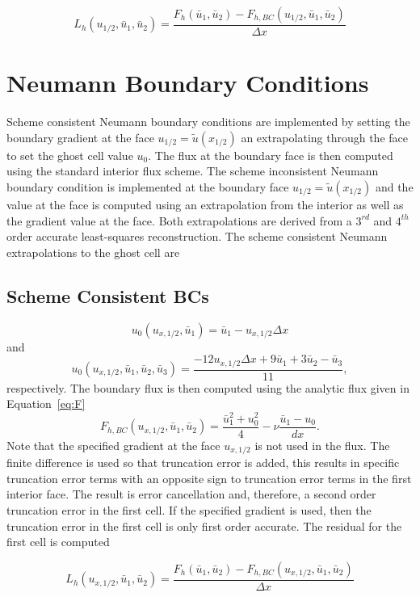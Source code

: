 \documentclass[10pt]{article}%
\begin{document}
\[
  L_h(u_{1/2},\bar u_{1},\bar u_{2}) = 
    \frac{F_h(\bar u_1, \bar u_2) - F_{h,BC}\left( u_{1/2}, \bar u_1, \bar u_2 \right)}{\Delta x}
\]






\section{Neumann Boundary Conditions}
Scheme consistent Neumann boundary conditions are implemented by setting the boundary gradient at the face $u_{1/2} = \tilde u(x_{1/2})$ an extrapolating through the face to set the ghost cell value $u_0$. The flux at the boundary face is then computed using the standard interior flux scheme. The scheme inconsistent Neumann boundary condition is implemented at the boundary face $u_{1/2} = \tilde u(x_{1/2})$ and the value at the face is computed using an extrapolation from the interior as well as the gradient value at the face. Both extrapolations are derived from a $3^{rd}$ and $4^{th}$ order accurate least-squares reconstruction. The scheme consistent Neumann extrapolations to the ghost cell are


\subsection{Scheme Consistent BCs}


\[
  u_{0}\left(u_{x,1/2}, \bar u_1 \right) = \bar u_1 - u_{x,1/2} \Delta x
\]
and
\[
  u_{0}(u_{x,1/2}, \bar u_1, \bar u_2, \bar u_3) = \frac{-12 u_{x,1/2}\Delta x + 9 \bar u_1 + 3 \bar u_2 -  \bar u_3 }{11},
\]
respectively. The boundary flux is then computed using the analytic flux given in Equation~\ref{eq:F}
\[
F_{h,BC}\left(u_{x,1/2}, \bar u_1, \bar u_2\right) 
= \frac{\bar u_1^2 + u_0^2}{4} - \nu \frac{\bar u_1 - u_0}{dx}.
\]
Note that the specified gradient at the face $u_{x,1/2}$ is not used in the flux. The finite difference is used so that truncation error is added, this results in specific truncation error terms with an opposite sign to truncation error terms in the first interior face. The result is error cancellation and, therefore, a second order truncation error in the first cell. If the specified gradient is used, then the truncation error in the first cell is only first order accurate. The residual for the first cell is computed 

\[
  L_h(u_{x,1/2},\bar u_{1},\bar u_{2}) = 
    \frac{F_h(\bar u_1, \bar u_2) - F_{h,BC}\left( u_{x,1/2}, \bar u_1, \bar u_2 \right)}{\Delta x}
\]
\end{document}
